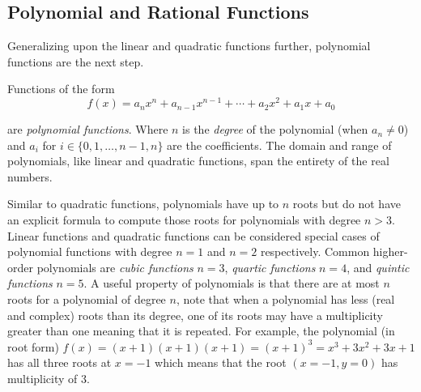 \subsection{Polynomial and Rational Functions}
Generalizing upon the linear and quadratic functions further, polynomial functions are the next step.

\begin{definition}
    Functions of the form
    \begin{equation}
        f(x) = a_n x^n + a_{n-1} x^{n-1} + \cdots + a_2 x^2 + a_1 x + a_0
    \end{equation}

    \noindent are \textit{polynomial functions}. Where $n$ is the \textit{degree} of the polynomial (when $a_n \neq 0$) and $a_i$ for $i \in \{0,1,\dots,n-1,n\}$ are the coefficients. The domain and range of polynomials, like linear and quadratic functions, span the entirety of the real numbers.
\end{definition}

Similar to quadratic functions, polynomials have up to $n$ roots but do not have an explicit formula to compute those roots for polynomials with degree $n > 3$. Linear functions and quadratic functions can be considered special cases of polynomial functions with degree $n=1$ and $n=2$ respectively. Common higher-order polynomials are \textit{cubic functions} $n=3$, \textit{quartic functions} $n=4$, and \textit{quintic functions} $n=5$. A useful property of polynomials is that there are at most $n$ roots for a polynomial of degree $n$, note that when a polynomial has less (real and complex) roots than its degree, one of its roots may have a multiplicity greater than one meaning that it is repeated. For example, the polynomial (in root form) $f(x) = (x+1)(x+1)(x+1) = (x+1)^3 = x^3 + 3x^2 + 3x + 1$ has all three roots at $x=-1$ which means that the root $(x=-1,y=0)$ has multiplicity of 3.

